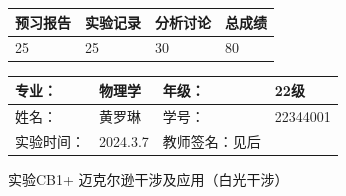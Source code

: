 \documentclass[dvipsnames, svgnames,a4paper,11pt]{article}
\begin{document}
	
	
	
	
	\begin{table}
		\renewcommand\arraystretch{1.7}
		\begin{tabularx}{\textwidth}{
				|X|X|X|X
				|X|X|X|X|}
			\hline
			\multicolumn{2}{|c|}{预习报告}&\multicolumn{2}{|c|}{实验记录}&\multicolumn{2}{|c|}{分析讨论}&\multicolumn{2}{|c|}{总成绩}\\
			\hline
			\LARGE25 & & \LARGE25 & & \LARGE30 & & \LARGE80 & \\
			\hline
		\end{tabularx}
	\end{table}
	
	\begin{table}
		\renewcommand\arraystretch{1.7}
		\begin{tabularx}{\textwidth}{|X|X|X|X|}
			\hline
			专业： &  物理学 &年级： & 22级\\
			\hline
			姓名： & 黄罗琳 & 学号： & 22344001\\
			\hline
			实验时间： & 2024.3.7 & 教师签名：见后 & \\
			\hline
		\end{tabularx}
	\end{table}
	
	\begin{center}
		\LARGE 实验CB1+ \quad 迈克尔逊干涉及应用（白光干涉）
	\end{center}
	
	
\end{document}
